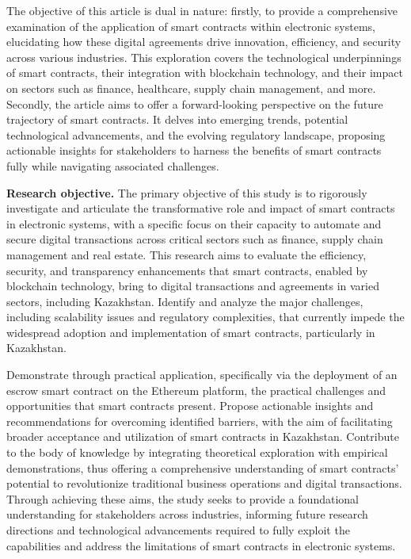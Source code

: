 \begin{multicols}{2}
The objective of this article is dual in nature: firstly, to provide a
comprehensive examination of the application of smart contracts within
electronic systems, elucidating how these digital agreements drive
innovation, efficiency, and security across various industries. This
exploration covers the technological underpinnings of smart contracts,
their integration with blockchain technology, and their impact on
sectors such as finance, healthcare, supply chain management, and more.
Secondly, the article aims to offer a forward-looking perspective on the
future trajectory of smart contracts. It delves into emerging trends,
potential technological advancements, and the evolving regulatory
landscape, proposing actionable insights for stakeholders to harness the
benefits of smart contracts fully while navigating associated
challenges.

{\bfseries Research objective.} The primary objective of this study is to
rigorously investigate and articulate the transformative role and impact
of smart contracts in electronic systems, with a specific focus on their
capacity to automate and secure digital transactions across critical
sectors such as finance, supply chain management and real estate. This
research aims to evaluate the efficiency, security, and transparency
enhancements that smart contracts, enabled by blockchain technology,
bring to digital transactions and agreements in varied sectors,
including Kazakhstan. Identify and analyze the major challenges,
including scalability issues and regulatory complexities, that currently
impede the widespread adoption and implementation of smart contracts,
particularly in Kazakhstan.

Demonstrate through practical application, specifically via the
deployment of an escrow smart contract on the Ethereum platform, the
practical challenges and opportunities that smart contracts present.
Propose actionable insights and recommendations for overcoming
identified barriers, with the aim of facilitating broader acceptance and
utilization of smart contracts in Kazakhstan. Contribute to the body of
knowledge by integrating theoretical exploration with empirical
demonstrations, thus offering a comprehensive understanding of smart
contracts' potential to revolutionize traditional business operations
and digital transactions. Through achieving these aims, the study seeks
to provide a foundational understanding for stakeholders across
industries, informing future research directions and technological
advancements required to fully exploit the capabilities and address the
limitations of smart contracts in electronic systems.


\end{multicols}
